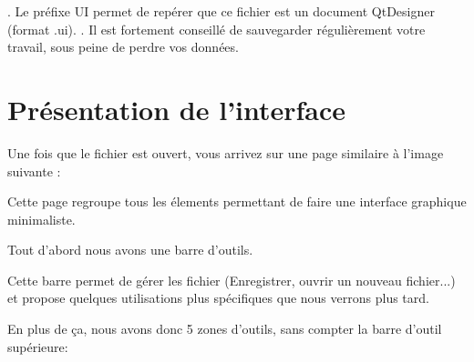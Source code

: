 . \newline
Le préfixe UI permet de repérer que ce fichier est un document QtDesigner (format .ui). . \newline \newline 
{\color{red}Il est fortement conseillé de sauvegarder régulièrement votre travail, sous peine de perdre vos données.}




\section{Présentation de l'interface}

Une fois que le fichier  est ouvert, vous arrivez sur une page similaire à l'image suivante : \newline


Cette page regroupe tous les élements permettant de faire une interface graphique minimaliste.


Tout d'abord nous avons une barre d'outils. \newline



Cette barre permet de gérer les fichier (Enregistrer, ouvrir un nouveau fichier...) et propose quelques utilisations plus spécifiques que nous verrons plus tard. \newline

En plus de ça, nous avons donc 5 zones d'outils, sans compter la barre d'outil supérieure: 

